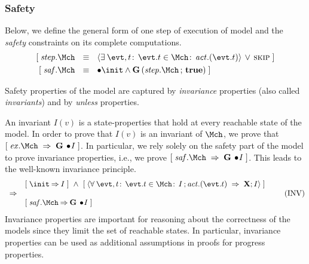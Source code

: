 \subsubsection{Safety} Below, we define the general form of one step
of execution of model \Mch and the \emph{safety} constraints on its
complete computations.
\begin{align}
  \ew{\step.\Mch  \Wide{&\eqv} \qexists{\evt, t}{\evt.t \in \Mch}{\action.(\evt.t)} \,\lor\, \SKIP} \label{eq:step} \\
  \ew{\safety.\Mch  \Wide{&\eqv}  \initially \init \land
    \G(\step.\Mch \, ; \,\ctrue)}
\end{align}
% 

Safety properties of the model are captured by \emph{invariance} properties
(also called \emph{invariants}) and by \emph{unless} properties. 

An invariant $I(v)$ is a state-properties that hold at every reachable state of the model.
In order to prove that $I(v)$ is an invariant of $\Mch$,
we prove that $\ew{\execution.\Mch \wide{\limp} \G \initially \! I}$.
In particular, we rely solely on the safety part of the model to prove
invariance properties, i.e., we prove $\ew{\safety.\Mch \wide{\limp} \G
  \initially \! I}$.  This leads to the well-known invariance principle.
\begin{equation}
  \begin{array}{ll}
    & \ew{\init \limp I} \wide{\land} 
    \ew{\qforall{\evt, t}{\evt.t \in \Mch}{I \, ;  \action.(\evt.t) ~\limp~ \X;I}} \\
    \implies &\\
    & \ew{\safety.\Mch \limp \G \initially \! I}
  \end{array}
  \tag{INV}
\end{equation}
Invariance properties are important for reasoning about the correctness
of the models since they limit the set of reachable states.  In
particular, invariance properties can be used as additional
assumptions in proofs for progress properties.

